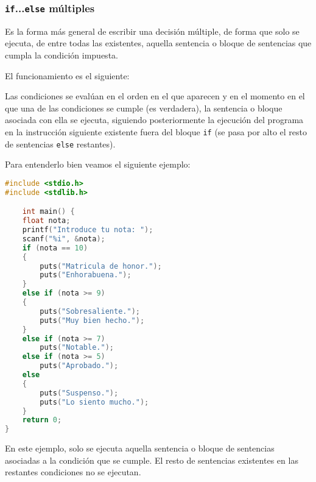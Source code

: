 \subsubsection{\texttt{if}...\texttt{else} múltiples}{
Es la forma más general de escribir una decisión múltiple, de forma que solo se ejecuta, de entre todas las existentes, aquella sentencia o bloque de sentencias que cumpla la condición impuesta.

El funcionamiento es el siguiente:

Las condiciones se evalúan en el orden en el que aparecen y en el momento en el que una de las condiciones se cumple (es verdadera), la sentencia o bloque asociada con ella se ejecuta, siguiendo posteriormente la ejecución del programa en la instrucción siguiente existente fuera del bloque \texttt{if} (se pasa por alto el resto de sentencias \texttt{else} restantes).

Para entenderlo bien veamos el siguiente ejemplo:
\begin{Ejemplo}
\begin{lstlisting}[language=C]
#include <stdio.h>
#include <stdlib.h>

    int main() {
    float nota;
    printf("Introduce tu nota: ");
    scanf("%i", &nota);
    if (nota == 10)
    {
        puts("Matricula de honor.");
        puts("Enhorabuena.");
    }
    else if (nota >= 9)
    {
        puts("Sobresaliente.");
        puts("Muy bien hecho.");
    }
    else if (nota >= 7)
        puts("Notable.");
    else if (nota >= 5)
        puts("Aprobado.");
    else
    {
        puts("Suspenso.");
        puts("Lo siento mucho.");
    }
    return 0;
}
\end{lstlisting}
\Explicacion
En este ejemplo, solo se ejecuta aquella sentencia o bloque de sentencias asociadas a la condición que se cumple. El resto de sentencias existentes en las restantes condiciones no se ejecutan.
\end{Ejemplo}
}
